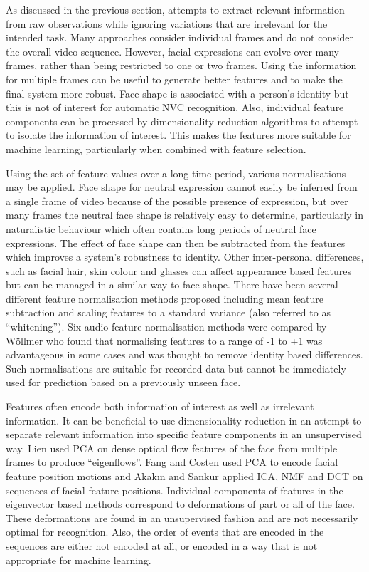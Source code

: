 As discussed in the previous section, \featureGeneration attempts to extract relevant information from raw observations while ignoring variations that are irrelevant for the intended task. Many \featureGeneration approaches consider individual frames and do not consider the overall video sequence. However, facial expressions can evolve over many frames, rather than being restricted to one or two frames. Using the information for multiple frames can be useful to generate better features and to make the final system more robust. Face shape is associated with a person's identity but this is not of interest for automatic \ac{NVC} recognition. Also, individual feature components can be processed by dimensionality reduction algorithms to attempt to isolate the information of interest. This makes the features more suitable for machine learning, particularly when combined with feature selection.

Using the set of feature values over a long time period, various normalisations may be applied. Face shape for neutral expression cannot easily be inferred from a single frame of video because of the possible presence of expression, but over many frames the neutral face shape is relatively easy to determine, particularly in naturalistic behaviour which often contains long periods of neutral face expressions. The effect of face shape can then be subtracted from the features which improves a system's robustness to identity. Other inter-personal differences, such as facial hair, skin colour and glasses can affect appearance based features but can be managed in a similar way to face shape. There have been several different feature normalisation methods proposed including mean feature subtraction \cite{Jeni2011, Tax2011} and scaling features to a standard variance \cite{Yang2009} (also referred to as ``whitening''). Six audio feature normalisation methods were compared by W\"{o}llmer \etal \cite{Wollmer2008} who found that normalising features to a range of -1 to +1 was advantageous in some cases and was thought to remove identity based differences. Such normalisations are suitable for recorded data but cannot be immediately used for prediction based on a previously unseen face. 


Features often encode both information of interest as well as irrelevant information. It can be beneficial to use dimensionality reduction in an attempt to separate relevant information into specific feature components in an unsupervised way. Lien \etal \cite{Lien1998a} used \ac{PCA} on dense optical flow features of the face from multiple frames to produce ``eigenflows''. Fang and Costen \cite{Fang2009} used \ac{PCA} to encode facial feature position motions and Akak{\i}n and Sankur \cite{Akakin2011} applied \ac{ICA}, \ac{NMF} and \ac{DCT} on sequences of facial feature positions. Individual components of features in the eigenvector based methods correspond to deformations of part or all of the face. These deformations are found in an unsupervised fashion and are not necessarily optimal for recognition. Also, the order of events that are encoded in the sequences are either not encoded at all, or encoded in a way that is not appropriate for machine learning. 

